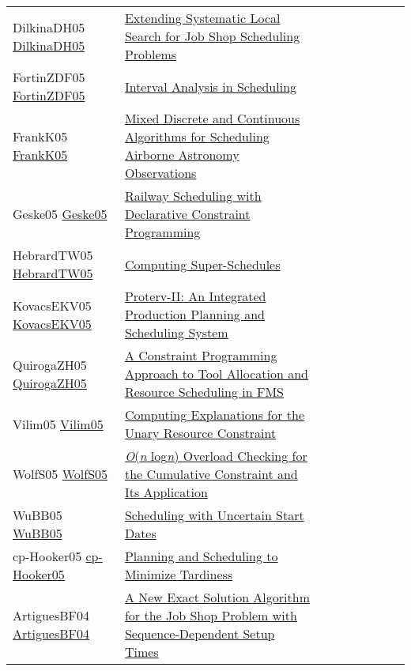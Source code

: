 {\begin{longtable}{p{3cm}p{7cm}lllllll}
DilkinaDH05 \href{https://doi.org/10.1007/11564751\_60}{DilkinaDH05} &  \href{papers/DilkinaDH05.pdf}{Extending Systematic Local Search for Job Shop Scheduling Problems} &  &  &  &  &  &  & \\
FortinZDF05 \href{https://doi.org/10.1007/11564751\_19}{FortinZDF05} &  \href{papers/FortinZDF05.pdf}{Interval Analysis in Scheduling} &  &  &  &  &  &  & \\
FrankK05 \href{https://doi.org/10.1007/11493853\_15}{FrankK05} &  \href{papers/FrankK05.pdf}{Mixed Discrete and Continuous Algorithms for Scheduling Airborne Astronomy Observations} &  &  &  &  &  &  & \\
Geske05 \href{https://doi.org/10.1007/11963578\_10}{Geske05} &  \href{papers/Geske05.pdf}{Railway Scheduling with Declarative Constraint Programming} &  &  &  &  &  &  & \\
HebrardTW05 \href{https://doi.org/10.1007/11564751\_117}{HebrardTW05} &  \href{papers/HebrardTW05.pdf}{Computing Super-Schedules} &  &  &  &  &  &  & \\
KovacsEKV05 \href{https://doi.org/10.1007/11564751\_118}{KovacsEKV05} &  \href{papers/KovacsEKV05.pdf}{Proterv-II: An Integrated Production Planning and Scheduling System} &  &  &  &  &  &  & \\
QuirogaZH05 \href{https://doi.org/10.1109/ROBOT.2005.1570686}{QuirogaZH05} &  \href{papers/QuirogaZH05.pdf}{A Constraint Programming Approach to Tool Allocation and Resource Scheduling in {FMS}} &  &  &  &  &  &  & \\
Vilim05 \href{https://doi.org/10.1007/11493853\_29}{Vilim05} &  \href{papers/Vilim05.pdf}{Computing Explanations for the Unary Resource Constraint} &  &  &  &  &  &  & \\
WolfS05 \href{https://doi.org/10.1007/11963578\_8}{WolfS05} &  \href{papers/WolfS05.pdf}{\emph{O}(\emph{n} log\emph{n}) Overload Checking for the Cumulative Constraint and Its Application} &  &  &  &  &  &  & \\
WuBB05 \href{https://doi.org/10.1007/11564751\_110}{WuBB05} &  \href{papers/WuBB05.pdf}{Scheduling with Uncertain Start Dates} &  &  &  &  &  &  & \\
cp-Hooker05 \href{https://doi.org/10.1007/11564751\_25}{cp-Hooker05} &  \href{papers/cp-Hooker05.pdf}{Planning and Scheduling to Minimize Tardiness} &  &  &  &  &  &  & \\
ArtiguesBF04 \href{https://doi.org/10.1007/978-3-540-24664-0\_3}{ArtiguesBF04} &  \href{papers/ArtiguesBF04.pdf}{A New Exact Solution Algorithm for the Job Shop Problem with Sequence-Dependent Setup Times} &  &  &  &  &  &  & \\

\end{longtable}}
